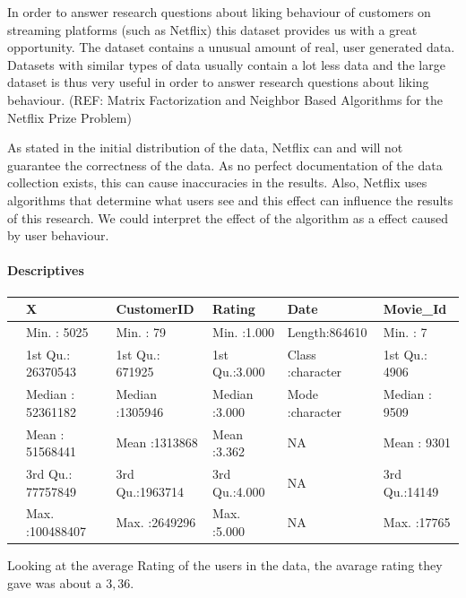 \documentclass[
  man]{apa6}
\begin{document}
In order to answer research questions about liking behaviour of
customers on streaming platforms (such as Netflix) this dataset provides
us with a great opportunity. The dataset contains a unusual amount of
real, user generated data. Datasets with similar types of data usually
contain a lot less data and the large dataset is thus very useful in
order to answer research questions about liking behaviour. (REF: Matrix
Factorization and Neighbor Based Algorithms for the Netflix Prize
Problem)

As stated in the initial distribution of the data, Netflix can and will
not guarantee the correctness of the data. As no perfect documentation
of the data collection exists, this can cause inaccuracies in the
results. Also, Netflix uses algorithms that determine what users see and
this effect can influence the results of this research. We could
interpret the effect of the algorithm as a effect caused by user
behaviour.

\hypertarget{descriptives}{%
\paragraph{Descriptives}\label{descriptives}}

\begin{table}
\centering
\begin{tabular}{l|l|l|l|l|l}
\hline
  &       X &   CustomerID &     Rating &     Date &    Movie\_Id\\
\hline
 & Min.   :     5025 & Min.   :     79 & Min.   :1.000 & Length:864610 & Min.   :    7\\
\hline
 & 1st Qu.: 26370543 & 1st Qu.: 671925 & 1st Qu.:3.000 & Class :character & 1st Qu.: 4906\\
\hline
 & Median : 52361182 & Median :1305946 & Median :3.000 & Mode  :character & Median : 9509\\
\hline
 & Mean   : 51568441 & Mean   :1313868 & Mean   :3.362 & NA & Mean   : 9301\\
\hline
 & 3rd Qu.: 77757849 & 3rd Qu.:1963714 & 3rd Qu.:4.000 & NA & 3rd Qu.:14149\\
\hline
 & Max.   :100488407 & Max.   :2649296 & Max.   :5.000 & NA & Max.   :17765\\
\hline
\end{tabular}
\end{table}

Looking at the average Rating of the users in the data, the avarage
rating they gave was about a \(3,36\).
\end{document}
